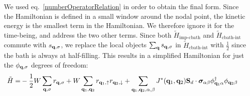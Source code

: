 \documentclass[reprint,hidelinks,onecolumn]{revtex4-2}
\begin{document}
We used eq.~\ref{numberOperatorRelation} in order to obtain the final form. Since the Hamiltonian is defined in a small window around the nodal point, the kinetic energy is the smallest term in the Hamiltonian. We therefore ignore it for the time-being, and address the two other terms. Since both \(\tilde H_\text{imp-cbath}\) and \(\tilde H_\text{cbath-int}\) commute with \(s_{{\bf q}, \sigma}\), we replace the local objects \(\sum_{\bf q}s_{{\bf q},\sigma}\) in \(\tilde H_\text{cbath-int}\) with \(\frac{1}{2}\) since the bath is always at half-filling. This results in a simplified Hamiltonian for just the \(\phi_{{\bf q},\sigma}\) degrees of freedom:
\begin{equation}\begin{aligned}
	\tilde H =& -\frac{1}{2}W\sum_{{\bf q},\sigma}r_{{\bf q},\sigma} + W\sum_{{\bf q}_1,{\bf q}_2}r_{{\bf q}_1,\uparrow} r_{{\bf q}_2,\downarrow} + \sum_{{\bf q}_1, {\bf q}_2,\alpha,\beta}J^*({\bf q}_1,{\bf q}_2){\bf S}_d\cdot{\boldsymbol\sigma}_{\alpha\beta} {\phi}^\dagger_{{\bf q}_1\alpha} \phi_{{\bf q}_2\beta}
\end{aligned}\end{equation}
\end{document}
